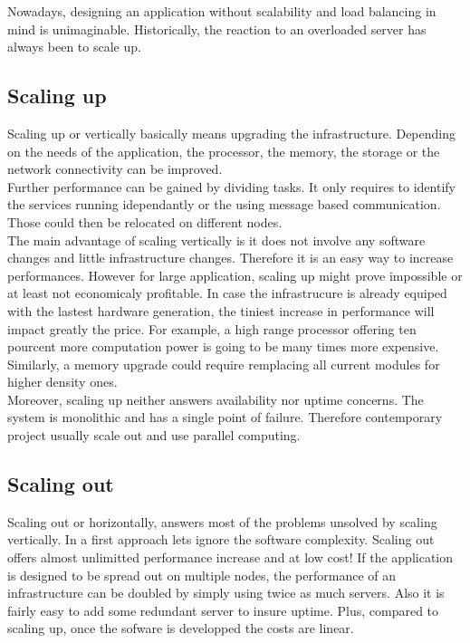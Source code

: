 Nowadays, designing an application without scalability and load balancing in
mind is unimaginable. Historically, the reaction to an overloaded server
has always been to scale up.\\

\subsection{Scaling up}

Scaling up or vertically basically means upgrading the infrastructure.
Depending on the needs of the application, the processor, the memory, the
storage or the network connectivity can be improved.\\

Further performance can be gained by dividing tasks. It only requires to
identify the services  running idependantly or the using message based
communication. Those could then be relocated on different nodes.\\

The main advantage of scaling vertically is it does not involve any software
changes and little infrastructure changes. Therefore it is an easy way to
increase performances. However for large application, scaling up might prove
impossible or at least not economicaly profitable. In case the infrastrucure 
is already equiped with the lastest hardware generation, the tiniest
increase in performance will impact greatly the price. For example, a high
range processor offering ten pourcent more computation power is going to be
many times more expensive. Similarly, a memory upgrade could require remplacing
all current modules for higher density ones.\\

Moreover, scaling up neither answers availability nor uptime concerns. The
system is monolithic and has a single point of failure. Therefore contemporary
project usually scale out and use parallel computing.\\

\subsection{Scaling out}
				
Scaling out or horizontally, answers most of the problems unsolved by scaling
vertically. In a first approach lets ignore the software complexity.  Scaling
out offers almost unlimitted performance increase and at low cost! If the
application is designed to be spread out on multiple nodes, the performance of
an infrastructure can be doubled by simply using twice as much servers. Also it
is fairly easy to add some redundant server to insure uptime. Plus, compared to
scaling up, once the sofware is developped the costs are linear.\\

